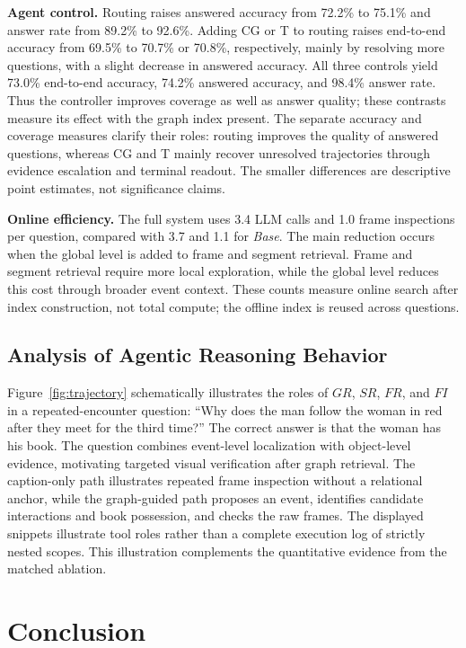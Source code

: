 \documentclass[11pt]{article}
\begin{document}
\textbf{Agent control.}
Routing raises answered accuracy from 72.2\% to 75.1\% and answer rate from 89.2\% to 92.6\%.
Adding CG or T to routing raises end-to-end accuracy from 69.5\% to 70.7\% or 70.8\%, respectively, mainly by resolving more questions, with a slight decrease in answered accuracy.
All three controls yield 73.0\% end-to-end accuracy, 74.2\% answered accuracy, and 98.4\% answer rate.
Thus the controller improves coverage as well as answer quality; these contrasts measure its effect with the graph index present.
The separate accuracy and coverage measures clarify their roles: routing improves the quality of answered questions, whereas CG and T mainly recover unresolved trajectories through evidence escalation and terminal readout.
The smaller differences are descriptive point estimates, not significance claims.

\textbf{Online efficiency.}
The full system uses 3.4 LLM calls and 1.0 frame inspections per question, compared with 3.7 and 1.1 for \emph{Base}.
The main reduction occurs when the global level is added to frame and segment retrieval.
Frame and segment retrieval require more local exploration, while the global level reduces this cost through broader event context.
These counts measure online search after index construction, not total compute; the offline index is reused across questions.

\subsection{Analysis of Agentic Reasoning Behavior}
\label{sec:analysis}

Figure~\ref{fig:trajectory} schematically illustrates the roles of $GR$, $SR$, $FR$, and $FI$ in a repeated-encounter question: ``Why does the man follow the woman in red after they meet for the third time?''
The correct answer is that the woman has his book.
The question combines event-level localization with object-level evidence, motivating targeted visual verification after graph retrieval.
The caption-only path illustrates repeated frame inspection without a relational anchor, while the graph-guided path proposes an event, identifies candidate interactions and book possession, and checks the raw frames.
The displayed snippets illustrate tool roles rather than a complete execution log of strictly nested scopes.
This illustration complements the quantitative evidence from the matched ablation.

\section{Conclusion}
\end{document}
